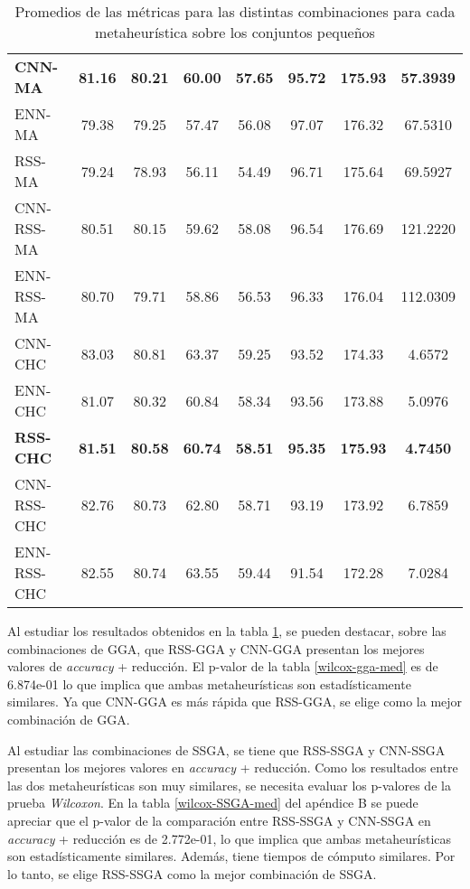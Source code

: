 \begin{table}[h!]
\begin{adjustbox}{max width =\textwidth}
\begin{tabular}{l c c c c c c c}
\hline

\textbf{CNN-MA} & \textbf{81.16} & \textbf{80.21} & \textbf{60.00} & \textbf{57.65} & \textbf{95.72} & \textbf{175.93} & \textbf{57.3939} \\
ENN-MA & 79.38 & 79.25 & 57.47 & 56.08 & 97.07 & 176.32 & 67.5310 \\
RSS-MA & 79.24 & 78.93 & 56.11 & 54.49 & 96.71 & 175.64 & 69.5927 \\
CNN-RSS-MA & 80.51 & 80.15 & 59.62 & 58.08 & 96.54 & 176.69 & 121.2220 \\
ENN-RSS-MA & 80.70 & 79.71 & 58.86 & 56.53 & 96.33 & 176.04 & 112.0309 \\

\hline

CNN-CHC & 83.03 & 80.81 & 63.37 & 59.25 & 93.52 & 174.33 & 4.6572 \\
ENN-CHC & 81.07 & 80.32 & 60.84 & 58.34 & 93.56 & 173.88 & 5.0976 \\
\textbf{RSS-CHC} & \textbf{81.51} & \textbf{80.58} & \textbf{60.74} & \textbf{58.51} & \textbf{95.35} & \textbf{175.93} & \textbf{4.7450} \\
CNN-RSS-CHC & 82.76 & 80.73 & 62.80 & 58.71 & 93.19 & 173.92 & 6.7859 \\
ENN-RSS-CHC  & 82.55 & 80.74 & 63.55 & 59.44 & 91.54 & 172.28 & 7.0284 \\


\hline
\end{tabular}
\end{adjustbox}
\caption{Promedios de las métricas para las distintas combinaciones para cada metaheurística sobre los conjuntos pequeños}
\label{med-all}

\end{table}

Al estudiar los resultados obtenidos en la tabla \ref{med-all}, se pueden destacar, sobre las combinaciones de GGA, que RSS-GGA y CNN-GGA presentan los mejores valores de \emph{accuracy} + reducción. El p-valor de la tabla \ref{wilcox-gga-med} es de 6.874e-01 lo que implica que ambas metaheurísticas son estadísticamente similares. Ya que CNN-GGA es más rápida que RSS-GGA, se elige como la mejor combinación de GGA.

Al estudiar las combinaciones de SSGA, se tiene que RSS-SSGA y CNN-SSGA presentan los mejores valores en \emph{accuracy} + reducción. Como los resultados entre las dos metaheurísticas son muy similares, se necesita evaluar los p-valores de la prueba \emph{Wilcoxon}. En la tabla \ref{wilcox-SSGA-med} del apéndice B se puede apreciar que el p-valor de la comparación entre RSS-SSGA y CNN-SSGA en \emph{accuracy} + reducción es de 2.772e-01, lo que implica que ambas metaheurísticas son estadísticamente similares. Además, tiene tiempos de cómputo similares. Por lo tanto, se elige RSS-SSGA como la mejor combinación de SSGA.

